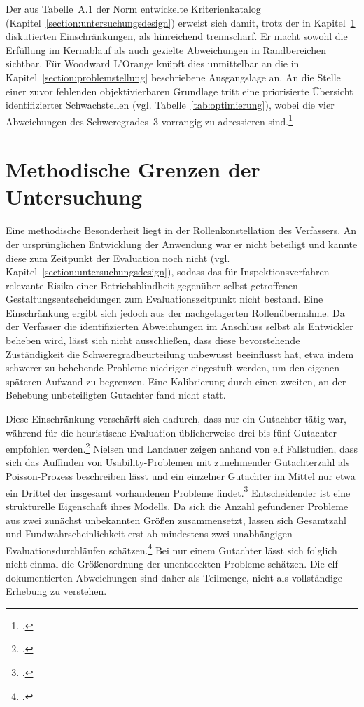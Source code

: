 Der aus Tabelle~A.1 der Norm entwickelte Kriterienkatalog
(Kapitel~\ref{section:untersuchungsdesign}) erweist sich damit, trotz der in
Kapitel~\ref{grenzen} diskutierten Einschränkungen, als hinreichend trennscharf.
Er macht sowohl die Erfüllung im Kernablauf als auch gezielte Abweichungen in
Randbereichen sichtbar. Für Woodward L'Orange knüpft dies unmittelbar an die in
Kapitel~\ref{section:problemstellung} beschriebene Ausgangslage an. An die Stelle
einer zuvor fehlenden objektivierbaren Grundlage tritt eine priorisierte Übersicht
identifizierter Schwachstellen (vgl. Tabelle~\ref{tab:optimierung}), wobei die
vier Abweichungen des Schweregrades~3 vorrangig zu adressieren
sind.\footcite[Vgl.][S.~47]{nielsen1994heuristic}

\section{Methodische Grenzen der Untersuchung}
\label{grenzen}

Eine methodische Besonderheit liegt in der Rollenkonstellation des Verfassers. An der
ursprünglichen Entwicklung der Anwendung war er nicht beteiligt und kannte diese zum
Zeitpunkt der Evaluation noch nicht (vgl. Kapitel~\ref{section:untersuchungsdesign}), sodass
das für Inspektionsverfahren relevante Risiko einer Betriebsblindheit gegenüber selbst
getroffenen Gestaltungsentscheidungen zum Evaluationszeitpunkt nicht bestand. Eine
Einschränkung ergibt sich jedoch aus der nachgelagerten Rollenübernahme. Da der Verfasser die
identifizierten Abweichungen im Anschluss selbst als Entwickler beheben wird, lässt sich nicht
ausschließen, dass diese bevorstehende Zuständigkeit die Schweregradbeurteilung unbewusst
beeinflusst hat, etwa indem schwerer zu behebende Probleme niedriger eingestuft werden, um den
eigenen späteren Aufwand zu begrenzen. Eine Kalibrierung durch einen zweiten, an der Behebung
unbeteiligten Gutachter fand nicht statt.

Diese Einschränkung verschärft sich dadurch, dass nur ein Gutachter tätig war, während für die
heuristische Evaluation üblicherweise drei bis fünf Gutachter empfohlen
werden.\footcite[Vgl.][S.~254 f.]{nielsen1990heuristic} Nielsen und Landauer zeigen anhand von elf
Fallstudien, dass sich das Auffinden von Usability-Problemen mit zunehmender Gutachterzahl als
Poisson-Prozess beschreiben lässt und ein einzelner Gutachter im Mittel nur etwa ein Drittel
der insgesamt vorhandenen Probleme
findet.\footcite[Vgl.][S.~206--207]{nielsen1993mathematical} Entscheidender ist eine
strukturelle Eigenschaft ihres Modells. Da sich die Anzahl gefundener Probleme aus zwei
zunächst unbekannten Größen zusammensetzt, lassen sich Gesamtzahl und Fundwahrscheinlichkeit
erst ab mindestens zwei unabhängigen Evaluationsdurchläufen
schätzen.\footcite[Vgl.][S.~208 f.]{nielsen1993mathematical} Bei nur einem Gutachter lässt sich
folglich nicht einmal die Größenordnung der unentdeckten Probleme schätzen. Die elf
dokumentierten Abweichungen sind daher als Teilmenge, nicht als vollständige Erhebung zu
verstehen.


